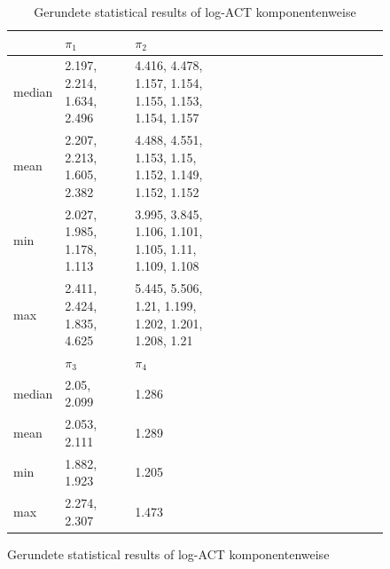 \documentclass{scrartcl}
\begin{document}
    \begin{figure}[H]
        \begin{table}[H]
            \centering
            \begin{tabular}{|l|l|l|l|l|l|l|l|l|l|l|l|l|l|l|}
                \hline & $\pi_1$ & $\pi_2$ \\ \hline
                median & 2.197, 2.214, 1.634, 2.496 & 4.416, 4.478, 1.157, 1.154, 1.155, 1.153, 1.154, 1.157 \\\hline
                mean & 2.207, 2.213, 1.605, 2.382 & 4.488, 4.551, 1.153, 1.15, 1.152, 1.149, 1.152, 1.152 \\\hline
                min & 2.027, 1.985, 1.178, 1.113 & 3.995, 3.845, 1.106, 1.101, 1.105, 1.11, 1.109, 1.108 \\\hline
                max & 2.411, 2.424, 1.835, 4.625 & 5.445, 5.506, 1.21, 1.199, 1.202, 1.201, 1.208, 1.21 \\\hline
                \hline & $\pi_3$ & $\pi_4$ \\ \hline
                median & 2.05, 2.099 & 1.286 \\\hline
                mean & 2.053, 2.111 & 1.289 \\\hline
                min & 1.882, 1.923 & 1.205 \\\hline
                max & 2.274, 2.307 & 1.473 \\\hline
            \end{tabular}
            \caption{Gerundete statistical results of log-ACT komponentenweise}
            \label{stat_results_log_act}
        \end{table}
    \end{figure}
\end{document}
